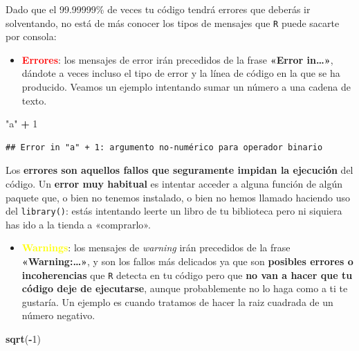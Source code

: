 \documentclass[11pt,]{book}
\newenvironment{Shaded}{\begin{snugshade}}{\end{snugshade}}
\newcommand{\DecValTok}[1]{\textcolor[rgb]{0.06,0.06,0.06}{#1}}
\newcommand{\KeywordTok}[1]{\textcolor[rgb]{0.27,0.27,0.27}{\textbf{#1}}}
\newcommand{\NormalTok}[1]{#1}
\newcommand{\OperatorTok}[1]{\textcolor[rgb]{0.43,0.43,0.43}{\textbf{#1}}}
\newcommand{\StringTok}[1]{\textcolor[rgb]{0.5,0.5,0.5}{#1}}
\providecommand{\tightlist}{%
  \setlength{\itemsep}{0pt}\setlength{\parskip}{0pt}}
\begin{document}
Dado que el 99.99999\% de veces tu código tendrá errores que deberás ir solventando, no está de más conocer los tipos de mensajes que \texttt{R} puede sacarte por consola:

\begin{itemize}
\tightlist
\item
  \textbf{\textcolor{red}{Errores}}: los mensajes de error irán precedidos de la frase \textbf{«Error in\ldots{}»}, dándote a veces incluso el tipo de error y la línea de código en la que se ha producido. Veamos un ejemplo intentando sumar un número a una cadena de texto.
\end{itemize}

\begin{Shaded}
\begin{Highlighting}[]
\StringTok{"a"} \OperatorTok{+}\StringTok{ }\DecValTok{1}
\end{Highlighting}
\end{Shaded}

\begin{verbatim}
## Error in "a" + 1: argumento no-numérico para operador binario
\end{verbatim}

Los \textbf{errores son aquellos fallos que seguramente impidan la ejecución} del código. Un \textbf{error muy habitual} es intentar acceder a alguna función de algún paquete que, o bien no tenemos instalado, o bien no hemos llamado haciendo uso del \texttt{library()}: estás intentando leerte un libro de tu biblioteca pero ni siquiera has ido a la tienda a «comprarlo».

\begin{itemize}
\tightlist
\item
  \textbf{\textcolor{yellow}{Warnings}}: los mensajes de \emph{warning} irán precedidos de la frase \textbf{«Warning:\ldots{}»}, y son los fallos más delicados ya que son \textbf{posibles errores o incoherencias} que \texttt{R} detecta en tu código pero que \textbf{no van a hacer que tu código deje de ejecutarse}, aunque probablemente no lo haga como a ti te gustaría. Un ejemplo es cuando tratamos de hacer la raiz cuadrada de un número negativo.
\end{itemize}

\begin{Shaded}
\begin{Highlighting}[]
\KeywordTok{sqrt}\NormalTok{(}\OperatorTok{-}\DecValTok{1}\NormalTok{)}
\end{Highlighting}
\end{Shaded}
\end{document}
